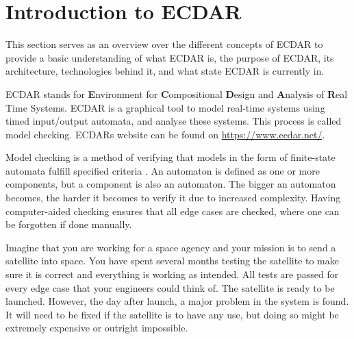 \section{Introduction to ECDAR}\label{sec:introduction-to-ecdar}
\commondisclaimer

This section serves as an overview over the different concepts of ECDAR to provide a basic understanding of what ECDAR is, the purpose of ECDAR, its architecture, technologies behind it, and what state ECDAR is currently in.

ECDAR stands for \textbf{E}nvironment for \textbf{C}ompositional \textbf{D}esign and \textbf{A}nalysis of \textbf{R}eal Time Systems.
ECDAR is a graphical tool to model real-time systems using timed input/output automata, and analyse these systems. 
This process is called model checking. ECDARs website can be found on \href{https://www.ecdar.net/}{https://www.ecdar.net/}.

Model checking is a method of verifying that models in the form of finite-state automata fulfill specified criteria \cite{modelchecking-handbook}. 
An automaton is defined as one or more components, but a component is also an automaton.
The bigger an automaton becomes, the harder it becomes to verify it due to increased complexity. 
Having computer-aided checking ensures that all edge cases are checked, where one can be forgotten if done manually.
 

Imagine that you are working for a space agency and your mission is to send a satellite into space.
You have spent several months testing the satellite to make sure it is correct and everything is working as intended.
All tests are passed for every edge case that your engineers could think of.
The satellite is ready to be launched.
However, the day after launch, a major problem in the system is found. 
It will need to be fixed if the satellite is to have any use, but doing so might be extremely expensive or outright impossible.

